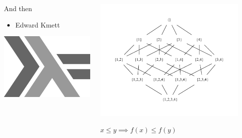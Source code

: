 \documentclass[usenames,dvipsnames,svgnames,table,aspectratio=1610,mathserif]{beamer}
\newcommand{\nl}{\vspace{\baselineskip}}
\begin{document}
\begin{frame}
\begin{columns}
\begin{column}{0.005\textwidth}
\end{column}
\begin{column}{0.4\textwidth}
And then
\begin{itemize}
\item Edward Kmett
\end{itemize}
\nl
\nl
\includegraphics[scale=0.2]{haskell.png}
\end{column}
\begin{column}{0.5\textwidth}
\includegraphics[scale=0.4]{powerset.pdf}

\nl
\nl

{\LARGE
  $x \le y \implies f(x) \le f(y)$
}
\end{column}
\end{columns}
\end{frame}
\end{document}
